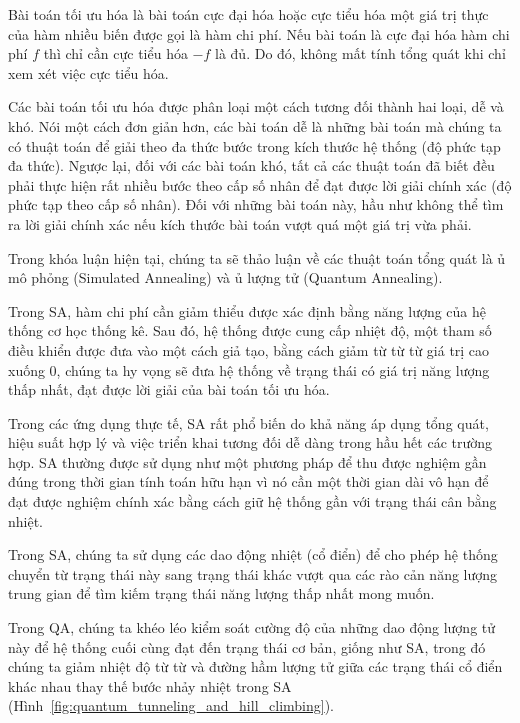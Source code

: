 
Bài toán tối ưu hóa là bài toán cực đại hóa hoặc cực tiểu hóa một giá trị thực của hàm nhiều biến được gọi là hàm chi phí. Nếu bài toán là cực đại hóa hàm chi phí $f$ thì chỉ cần cực tiểu hóa $-f$ là đủ. Do đó, không mất tính tổng quát khi chỉ xem xét việc cực tiểu hóa.

Các bài toán tối ưu hóa được phân loại một cách tương đối thành hai loại, dễ và khó. Nói một cách đơn giản hơn, các bài toán dễ là những bài toán mà chúng ta có thuật toán để giải theo đa thức bước trong kích thước hệ thống (độ phức tạp đa thức). Ngược lại, đối với các bài toán khó, tất cả các thuật toán đã biết đều phải thực hiện rất nhiều bước theo cấp số nhân để đạt được lời giải chính xác (độ phức tạp theo cấp số nhân). Đối với những bài toán này, hầu như không thể tìm ra lời giải chính xác nếu kích thước bài toán vượt quá một giá trị vừa phải.

Trong khóa luận hiện tại, chúng ta sẽ thảo luận về các thuật toán tổng quát là ủ mô phỏng (Simulated Annealing) và ủ lượng tử (Quantum Annealing).

Trong SA, hàm chi phí cần giảm thiểu được xác định bằng năng lượng của hệ thống cơ học thống kê. Sau đó, hệ thống được cung cấp nhiệt độ, một tham số điều khiển được đưa vào một cách giả tạo, bằng cách giảm từ từ từ giá trị cao xuống 0, chúng ta hy vọng sẽ đưa hệ thống về trạng thái có giá trị năng lượng thấp nhất, đạt được lời giải của bài toán tối ưu hóa.

Trong các ứng dụng thực tế, SA rất phổ biến do khả năng áp dụng tổng quát, hiệu suất hợp lý và việc triển khai tương đối dễ dàng trong hầu hết các trường hợp. SA thường được sử dụng như một phương pháp để thu được nghiệm gần đúng trong thời gian tính toán hữu hạn vì nó cần một thời gian dài vô hạn để đạt được nghiệm chính xác bằng cách giữ hệ thống gần với trạng thái cân bằng nhiệt.

Trong SA, chúng ta sử dụng các dao động nhiệt (cổ điển) để cho phép hệ thống chuyển từ trạng thái này sang trạng thái khác vượt qua các rào cản năng lượng trung gian để tìm kiếm trạng thái năng lượng thấp nhất mong muốn.

Trong QA, chúng ta khéo léo kiểm soát cường độ của những dao động lượng tử này để hệ thống cuối cùng đạt đến trạng thái cơ bản, giống như SA, trong đó chúng ta giảm nhiệt độ từ từ và đường hầm lượng tử giữa các trạng thái cổ điển khác nhau thay thế bước nhảy nhiệt trong SA (Hình~\ref{fig:quantum_tunneling_and_hill_climbing}).

